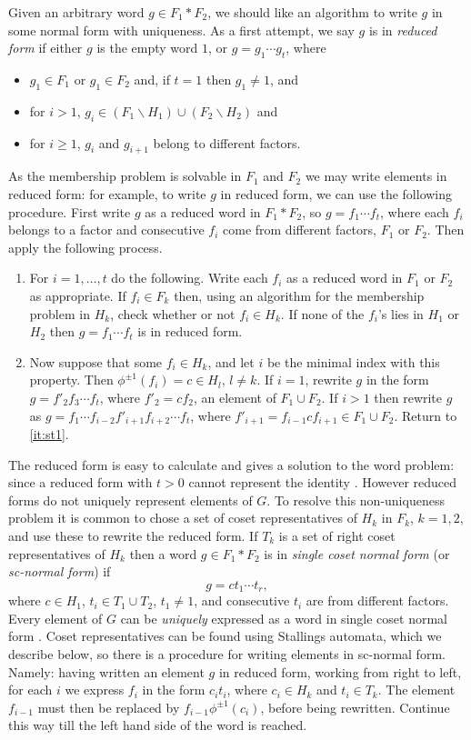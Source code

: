 \documentclass[a4paper,12pt]{article}
\numberwithin{equation}{section}
\numberwithin{figure}{section}
\newcommand{\be}{\begin{enumerate}}
\newcommand{\ee}{\end{enumerate}}
\begin{document}
Given an arbitrary word $g\in F_1\ast F_2$,
we should like an algorithm to write $g$ in
some normal form with uniqueness. As a first attempt,
 we say $g$ is in \emph{reduced form} if either $g$ is the empty word $1$, or 
$g = g_1 \cdots g_t$, where
\begin{itemize}
\item
$g_1 \in F_1$ or $g_1 \in F_2$ and, if $t=1$ then $g_1\neq 1$,  and
\item
for
$i > 1$,    $g_i \in (F_1 \backslash H_1)\cup (F_2\backslash H_2)$ and
\item for $i\ge 1$,   $g_i$
and  ${g_{i+1}}$ belong to  different factors.
\end{itemize}
As the membership problem
is solvable in $F_1$ and $F_2$ we may write elements in reduced form: for example,
to write $g$ in reduced form,
we can use the following procedure.
First write $g$  as a reduced word in $F_1\ast F_2$, so $g=f_1\cdots f_t$, where
each $f_i$ belongs to a factor and
consecutive $f_i$ come from different factors, $F_1$ or $F_2$. Then apply the
following process.
\be[Step 1]
\item\label{it:st1} For $i=1,\ldots ,t$ do the following.
Write each $f_i$ as  a reduced word in $F_1$ or $F_2$ as appropriate.
If $f_i\in F_k$ then,
using an algorithm for the membership problem in $H_k$, check whether or not 
$f_i \in H_k$.
 If none of the $f_i$'s lies in $H_1$ or $H_2$ then
$g= f_1 \cdots f_t$ is in  reduced form.
\item  Now suppose that some $f_i \in H_k$,  and let  $i$ be the
minimal index with this property. Then $\phi^{\pm 1}(f_i)=c\in H_{l}$, $l\neq k$.
If $i = 1$, rewrite $g$  in the
form $g = f'_2 f_3 \cdots f_t$,  where  $f'_2 = cf_2$, an element of $F_1\cup F_2$.
If $i > 1$ then rewrite $g$ as
$g = f_1 \cdots f_{i-2} f'_{i+1}f_{i+2} \cdots f_t$, where
$f'_{i+1} = f_{i-1}c f_{i+1}\in F_1\cup F_2$. Return to
\ref{it:st1}.
\ee

The reduced form is easy to calculate and gives a solution to the word problem: since
a reduced form with $t>0$ cannot represent the identity \cite[Theorem 2.6]{LS}.
However reduced forms do not uniquely represent
 elements of $G$. To resolve this non-uniqueness problem it is common to
chose a set of coset representatives of $H_k$ in $F_k$, $k=1,2$, and use these to rewrite
the reduced form. If $T_k$ is a set of right coset representatives of $H_k$ then
 a word $g\in F_1\ast F_2$ is in \emph{single coset normal form} (or \emph{sc-normal 
form}) if
\[g=ct_1\cdots t_r,\]
where $c\in H_1$, $t_i\in T_1\cup T_2$, $t_1\neq 1$, and consecutive $t_i$ are from
different factors. Every element of $G$ can be \emph{uniquely} expressed as a word in 
single coset
normal form \cite[Theorem 4.4]{MKS}.
Coset representatives can be found using Stallings automata, which we describe below, so
there is a procedure for writing elements in sc-normal form. Namely:
having written an element $g$ in reduced form,
working from right to left, for each $i$
 we express $f_i$ in the
form $c_it_i$, where $c_i\in H_k$ and $t_i\in T_k$. The element $f_{i-1}$ must 
then be replaced
by $f_{i-1}\phi^{\pm 1}(c_i)$, before being rewritten. Continue this way till the
left hand side of the word is reached.
\end{document}

